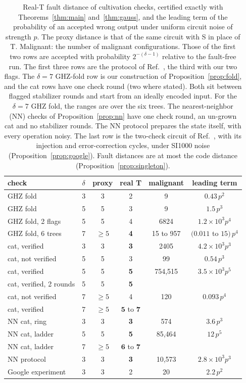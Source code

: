 \documentclass[aps,prl,reprint,twocolumn,amsmath,amssymb,floatfix,nofootinbib,superscriptaddress]{revtex4-2}
\theoremstyle{definition}
\theoremstyle{remark}
\begin{document}
\begin{table}[h]
\caption{Real-T fault distance of cultivation checks, certified exactly with Theorems~\ref{thm:main} and~\ref{thm:gauss}, and the leading term of the probability of an accepted wrong output under uniform circuit noise of strength $p$. The proxy distance is that of the same circuit with S in place of T. Malignant: the number of malignant configurations. Those of the first two rows are accepted with probability $2^{-(\delta-1)}$ relative to the fault-free run. The first three rows are the protocol of Ref.~\cite{cultivation}, the third with our two flags. The $\delta=7$ GHZ-fold row is our construction of Proposition~\ref{prop:fold}, and the cat rows have one check round (two where stated). Both sit between flagged stabilizer rounds and start from an ideally encoded input. For the $\delta=7$ GHZ fold, the ranges are over the six trees. The nearest-neighbor (NN) checks of Proposition~\ref{prop:nn} have one check round, an un-grown cat and no stabilizer rounds. The NN protocol prepares the state itself, with every operation noisy. The last row is the two-check circuit of Ref.~\cite{googlecultivation}, with its injection and error-correction cycles, under SI1000 noise (Proposition~\ref{prop:google}). Fault distances are at most the code distance (Proposition~\ref{prop:singleton}).}
\label{tab:full}
\begin{ruledtabular}
\begin{tabular}{lccccc}
check & $\delta$ & proxy & real T & malignant & leading term \\
\hline
GHZ fold~\cite{cultivation} & 3 & 3 & 2 & 9 & $0.43\,p^2$ \\
GHZ fold~\cite{cultivation} & 5 & 5 & 3 & 9 & $1.5\,p^3$ \\
GHZ fold, 2 flags & 5 & 5 & 4 & 6824 & $1.2\times10^3p^4$ \\
GHZ fold, 6 trees & 7 & $\geq5$ & \textbf{4} & 15 to 957 & $(0.011$ to $15)\,p^4$ \\
cat, verified & 3 & 3 & \textbf{3} & 2405 & $4.2\times10^3p^3$ \\
cat, not verified & 5 & 5 & 3 & 99 & $0.54\,p^3$ \\
cat, verified & 5 & 5 & \textbf{5} & 754{,}515 & $3.5\times10^3p^5$ \\
cat, verified, 2 rounds & 5 & 5 & \textbf{5} & & \\
cat, not verified & 7 & $\geq5$ & 4 & 120 & $0.093\,p^4$ \\
cat, verified & 7 & $\geq5$ & $\mathbf{5}$ to $\mathbf{7}$ & & \\
NN cat, ring & 3 & 3 & \textbf{3} & 574 & $3.6\,p^3$ \\
NN cat, ladder & 5 & 5 & \textbf{5} & 85{,}464 & $12\,p^5$ \\
NN cat, ladder & 7 & $\geq5$ & $\mathbf{6}$ to $\mathbf{7}$ & & \\
NN protocol & 3 & 3 & \textbf{3} & 10{,}573 & $2.8\times10^3p^3$ \\
Google experiment & 3 & 3 & 2 & 20 & $2.2\,p^2$ \\
\end{tabular}
\end{ruledtabular}
\end{table}
\end{document}
